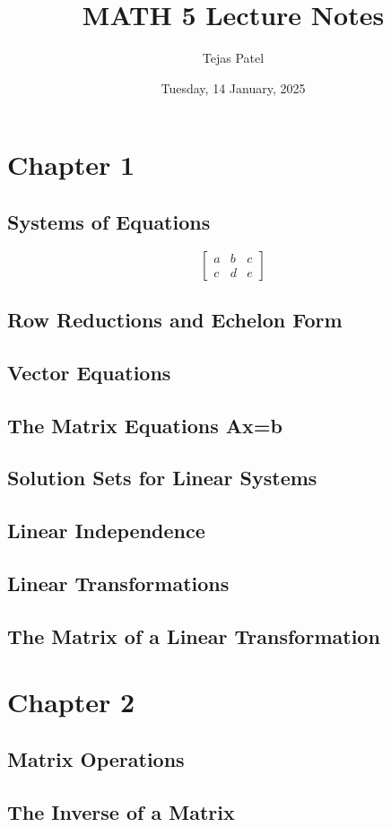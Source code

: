 \documentclass{article}
\title{MATH 5 Lecture Notes}
\date{Tuesday, 14 January, 2025}
\author{Tejas Patel}
\begin{document}
\maketitle
\tableofcontents
\pagebreak
\section{Chapter 1}
\subsection{Systems of Equations}
\[
\left[\begin{array}{cc|c}
a & b & c \\
c & d & e
\end{array}\right]
\]
\subsection{Row Reductions and Echelon Form}
\subsection{Vector Equations}
\subsection{The Matrix Equations Ax=b}
\subsection{Solution Sets for Linear Systems}
\subsection{Linear Independence}
\subsection{Linear Transformations}
\subsection{The Matrix of a Linear Transformation}
\section{Chapter 2}
\subsection{Matrix Operations}
\subsection{The Inverse of a Matrix}
\end{document}
